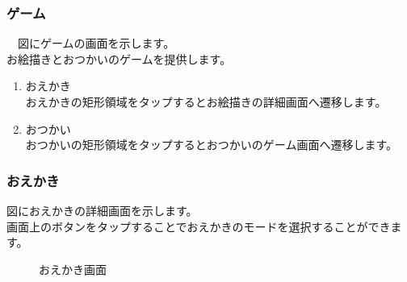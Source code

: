 \documentclass[a4j]{jarticle}
\begin{document}
\subsubsection{ゲーム}
　図にゲームの画面を示します。\\
お絵描きとおつかいのゲームを提供します。
\begin{enumerate}
  \renewcommand{\labelenumi}{\textcircled{\scriptsize \theenumi}}
\item おえかき\\
  おえかきの矩形領域をタップするとお絵描きの詳細画面へ遷移します。
\item おつかい\\
  おつかいの矩形領域をタップするとおつかいのゲーム画面へ遷移します。
\end{enumerate}

\subsubsection{おえかき}
図におえかきの詳細画面を示します。\\
画面上のボタンをタップすることでおえかきのモードを選択することができます。\\

\begin{figure}[H]
    \begin{center}
    \caption {おえかき画面}
    \label{oekaki1}
    \end{center}
\end{figure}
\end{document}
